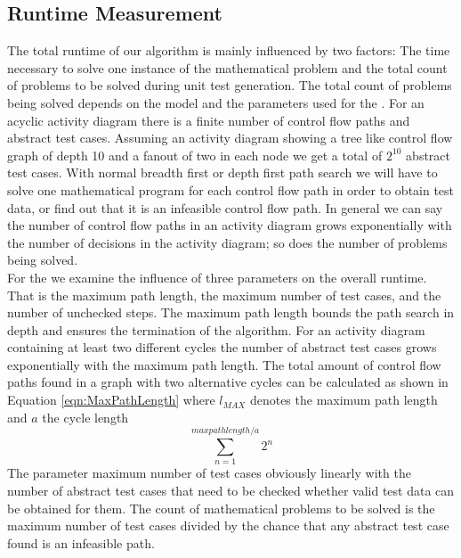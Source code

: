 \subsection{Runtime Measurement}
The total runtime of our algorithm is mainly influenced by two factors: The time necessary to solve one instance of the mathematical problem and the total count of problems to be solved during unit test generation. The total count of problems being solved depends on the model and the parameters used for the . For an acyclic activity diagram there is a finite number of control flow paths and abstract test cases. Assuming an activity diagram showing a tree like control flow graph of depth 10 and a fanout of two in each node we get a total of $2^{10}$ abstract test cases. With normal breadth first or depth first path search we will have to solve one mathematical program for each control flow path in order to obtain test data, or find out that it is an infeasible control flow path. In general we can say the number of control flow paths in an activity diagram grows exponentially with the number of decisions in the activity diagram; so does the number of problems being solved.\\
For the  we examine the influence of three parameters on the overall runtime. That is the maximum path length, the maximum number of test cases, and the number of unchecked steps. The maximum path length bounds the path search in depth and ensures the termination of the algorithm. For an activity diagram containing at least two different cycles the number of abstract test cases grows exponentially with the maximum path length. %
The total amount of control flow paths found in a graph with two alternative cycles can be calculated as shown in Equation \ref{eqn:MaxPathLength} where $l_{MAX}$ denotes the maximum path length and $a$ the cycle length
\begin{equation}\sum_{n=1}^{max path length/a}{2^n}\label{eqn:MaxPathLength}\end{equation}
The parameter maximum number of test cases obviously linearly with the number of abstract test cases that need to be checked whether valid test data can be obtained for them. The count of mathematical problems to be solved is the maximum number of test cases divided by the chance that any abstract test case found is an infeasible path. 
